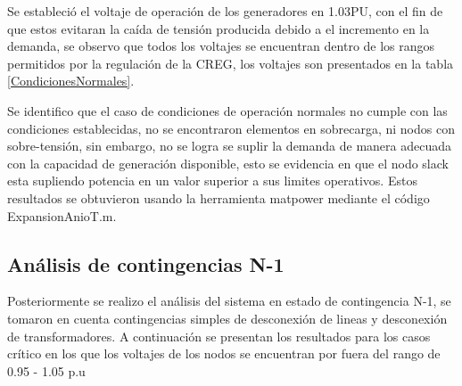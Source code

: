 \documentclass{article}
\begin{document}
Se estableció el voltaje de operación de los generadores en 1.03PU, con el fin de que estos evitaran la caída de tensión producida debido a el incremento en la demanda, se observo que todos los voltajes se encuentran dentro de los rangos permitidos por la regulación de la CREG, los voltajes son presentados en la tabla \ref{CondicionesNormales}.



Se identifico que el caso de condiciones de operación normales no  cumple con las condiciones establecidas, no se encontraron elementos en sobrecarga, ni nodos con sobre-tensión, sin embargo, no se logra se suplir la demanda de manera adecuada con la capacidad de generación disponible, esto se evidencia en que el nodo slack esta supliendo potencia en un valor superior a sus limites operativos. Estos resultados se obtuvieron usando la herramienta matpower mediante el código ExpansionAnioT.m. 

\newpage
\subsection{Análisis de contingencias N-1}

Posteriormente se realizo el análisis del sistema en estado de contingencia N-1, se tomaron en cuenta contingencias simples de desconexión de lineas y desconexión de transformadores.  A continuación se presentan los resultados para los casos crítico  en los que los voltajes de los nodos se encuentran por fuera del rango de 0.95 - 1.05 p.u
\end{document}
